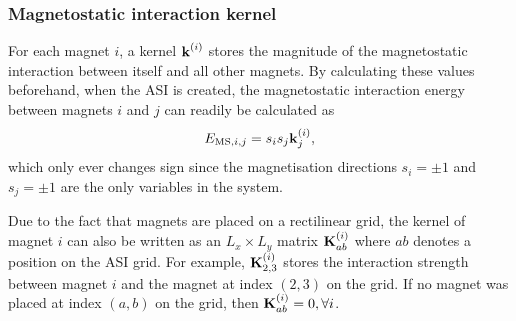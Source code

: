 \subsubsection{Magnetostatic interaction kernel}
For each magnet $i$, a kernel $\boldsymbol{\mathbf{k}}^{(i)}$ stores the magnitude of the magnetostatic interaction between itself and all other magnets.
By calculating these values beforehand, when the ASI is created, the magnetostatic interaction energy between magnets $i$ and $j$ can readily be calculated as
\begin{equation}
	E_{\mathrm{MS},i,j}= s_i s_j \boldsymbol{\mathbf{k}}^{(i)}_j \mathrm{,}
\end{equation}
which only ever changes sign since the magnetisation directions $s_i = \pm 1$ and $s_j = \pm 1$ are the only variables in the system. \par
Due to the fact that magnets are placed on a rectilinear grid, the kernel of magnet $i$ can also be written as an $L_x \times L_y$ matrix $\boldsymbol{\mathbf{K}}^{(i)}_{ab}$ where $ab$ denotes a position on the ASI grid.
For example, $\boldsymbol{\mathbf{K}}^{(i)}_{2,3}$ stores the interaction strength between magnet $i$ and the magnet at index $(2,3)$ on the grid.
If no magnet was placed at index $(a,b)$ on the grid, then $\boldsymbol{\mathbf{K}}^{(i)}_{ab} = 0, \forall i$. \\\par

